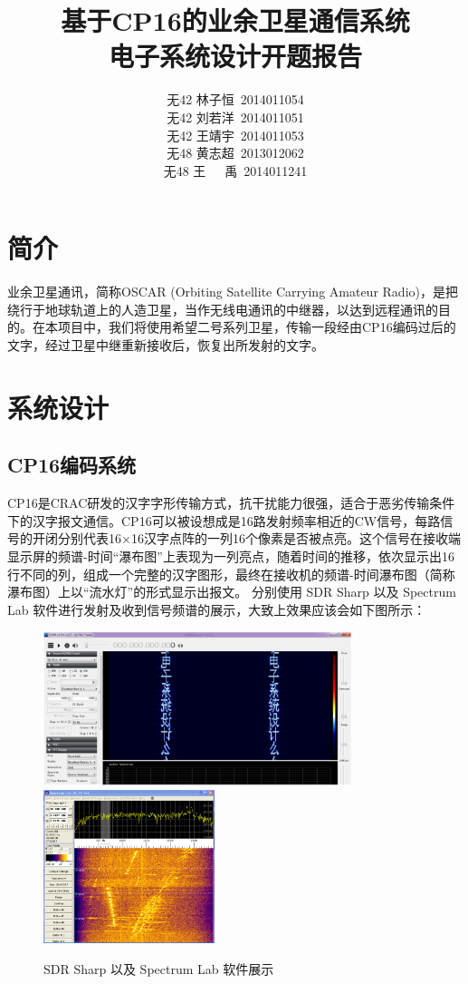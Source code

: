\documentclass[UTF8, a4paper]{ctexart}
\author{无42 林子恒~2014011054\\
无42 刘若洋~2014011051\\
无42 王靖宇~2014011053\\
无48 黄志超~2013012062\\
无48 王~~~禹~2014011241}
\title{基于CP16的业余卫星通信系统\\ \large{电子系统设计开题报告}}
\date{}
\begin{document}
    \maketitle
    \thispagestyle{empty}

  \section{简介}
  业余卫星通讯，简称OSCAR (Orbiting Satellite Carrying Amateur Radio)，是把绕行于地球轨道上的人造卫星，当作无线电通讯的中继器，以达到远程通讯的目的。在本项目中，我们将使用希望二号系列卫星，传输一段经由CP16编码过后的文字，经过卫星中继重新接收后，恢复出所发射的文字。
  
  \section{系统设计}
  \subsection{CP16编码系统}
  CP16是CRAC研发的汉字字形传输方式，抗干扰能力很强，适合于恶劣传输条件下的汉字报文通信。CP16可以被设想成是16路发射频率相近的CW信号，每路信号的开闭分别代表16×16汉字点阵的一列16个像素是否被点亮。这个信号在接收端显示屏的频谱-时间“瀑布图”上表现为一列亮点，随着时间的推移，依次显示出16行不同的列，组成一个完整的汉字图形，最终在接收机的频谱-时间瀑布图（简称瀑布图）上以“流水灯”的形式显示出报文。
分别使用 SDR Sharp 以及 Spectrum Lab 软件进行发射及收到信号频谱的展示，大致上效果应该会如下图所示：

   \begin{figure}[H]
       \centering
       \includegraphics[width=9cm]{figure/sdr-sharp.png}
       \includegraphics[width=5cm]{figure/spectrum-lab.png}
     \caption{SDR Sharp 以及 Spectrum Lab 软件展示}
   \end{figure}
\end{document}
